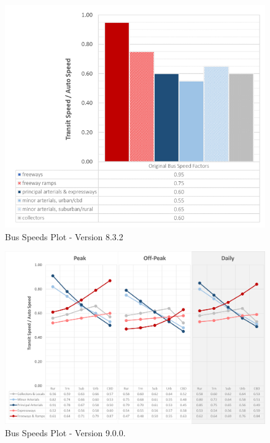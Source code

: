 \documentclass[
  letterpaper,
  DIV=11,
  numbers=noendperiod,
  titlepage=false]{scrreprt}
\begin{document}
\begin{figure}[H]

{\centering \includegraphics{v9x/v900/whats-new/_pictures/old_bus_speeds.png}

}

\caption{\label{fig-pdf-old-bus-speeds-plot}Bus Speeds Plot - Version
8.3.2}

\end{figure}

\begin{figure}[H]

{\centering \includegraphics{v9x/v900/whats-new/_pictures/pdf-bus-speeds-plot.png}

}

\caption{\label{fig-pdf-bus-speeds-plot}Bus Speeds Plot - Version
9.0.0.}

\end{figure}
\end{document}
